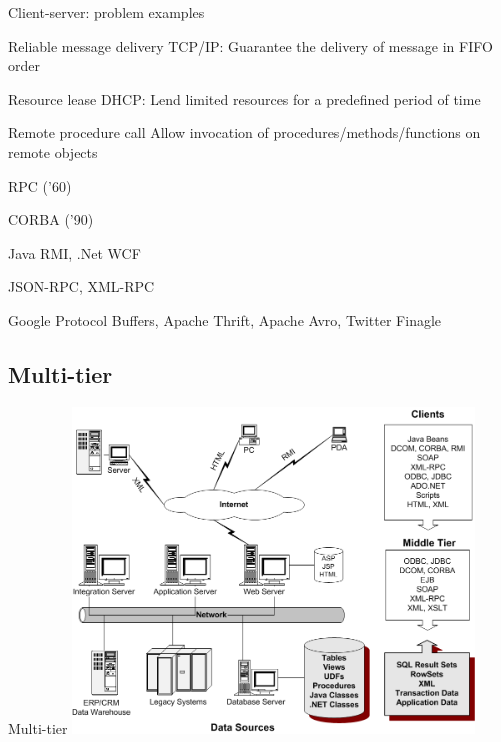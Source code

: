 \begin{frame}[shrink]{Client-server: problem examples}
\begin{block}{Reliable message delivery}
TCP/IP: Guarantee the delivery of message in FIFO order
\end{block}

\begin{block}{Resource lease}
DHCP: Lend limited resources for a predefined period of time
\end{block}

\begin{block}{Remote procedure call}
Allow invocation of procedures/methods/functions on remote objects
\BI
\item RPC ('60)
\item CORBA ('90)
\item Java RMI, .Net WCF 
\item JSON-RPC, XML-RPC
\item Google Protocol Buffers, Apache Thrift, Apache Avro, Twitter Finagle
\EI
\end{block}

\end{frame}



\subsection{Multi-tier}

\begin{frame}{Multi-tier}
\includegraphics[width=0.8\textwidth]{multi-tier.png}	
\end{frame}

